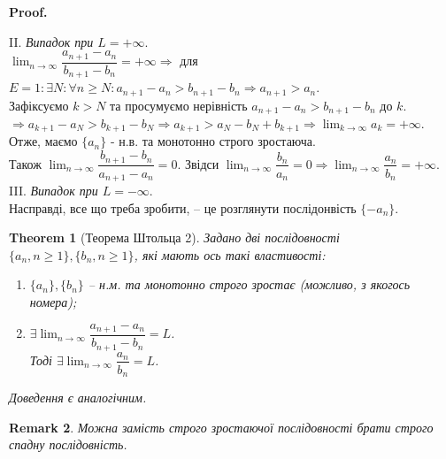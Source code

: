 \documentclass[a4paper, 14pt]{article}
\makeatletter
\def\qed{$\blacksquare$}
\theoremstyle{theoremdd}
\newtheorem{theorem}{Theorem}[subsection]
\theoremstyle{theoremdd}
\theoremstyle{theoremdd}
\theoremstyle{theoremdd}
\theoremstyle{theoremdd}
\theoremstyle{theoremdd}
\newtheorem{remark}[theorem]{Remark}
\theoremstyle{theoremdd}
\theoremstyle{theoremdd}
\renewenvironment{proof}[1][Proof.\\]{\par
\pushQED{\hfill \qed}%
\normalfont \topsep6\p@\@plus6\p@\relax
\trivlist
\item\relax
{\bfseries
#1\@addpunct{.}}\hspace\labelsep\ignorespaces
}{%
\popQED\endtrivlist\@endpefalse
}
\makeatother
\begin{document}
\begin{proof}
	II. \textit{Випадок при $L = +\infty$}. \\
	$\displaystyle \lim_{n \to \infty} \dfrac{a_{n+1} - a_n}{b_{n+1} - b_n} = + \infty \Rightarrow$ для $E = 1: \exists N: \forall n \geq N: a_{n+1} - a_n > b_{n+1} - b_n \Rightarrow a_{n+1} > a_n$.\\
	Зафіксуємо $k > N$ та просумуємо нерівність $a_{n+1} - a_n > b_{n+1} - b_n$ до $k$.\\
	$\Rightarrow a_{k+1} - a_N > b_{k+1} - b_N \Rightarrow a_{k+1} > a_N-b_N + b_{k+1} \Rightarrow \displaystyle\lim_{k \to \infty} a_k = +\infty$.\\
	Отже, маємо $\{a_n\}$ - н.в. та монотонно строго зростаюча.\\
	Також $\displaystyle \lim_{n \to \infty} \dfrac{b_{n+1} - b_n}{a_{n+1} - a_n} = 0$.
	Звідси $\displaystyle \lim_{n \to \infty} \dfrac{b_n}{a_n} = 0 \Rightarrow \lim_{n \to \infty} \dfrac{a_n}{b_n} = + \infty$.
	\bigskip \\
	III. \textit{Випадок при $L = -\infty$}.\\
	Насправді, все що треба зробити, -- це розглянути послідонвість $\{-a_n\}$.
	\end{proof}
	
	\begin{theorem}[Теорема Штольца 2]
	Задано дві послідовності $\{a_n, n \geq 1\}, \{b_n, n \geq 1\}$, які мають ось такі властивості:
	\begin{enumerate}[nosep,wide=0pt,label={\arabic*)}]
	\item $\{a_n\}, \{b_n\}$ -- н.м. та монотонно строго зростає (можливо, з якогось номера);
	\item $\exists \displaystyle \lim_{n \to \infty} \dfrac{a_{n+1} - a_n}{b_{n+1} - b_n} = L$.\\
	Тоді $\exists \displaystyle \lim_{n \to \infty} \dfrac{a_n}{b_n} = L$.
	\end{enumerate}
	\textit{Доведення є аналогічним.}
	\end{theorem}
	
	\begin{remark}
	Можна замість строго зростаючої послідовності брати строго спадну послідовність.
	\end{remark}
	
\end{document}
